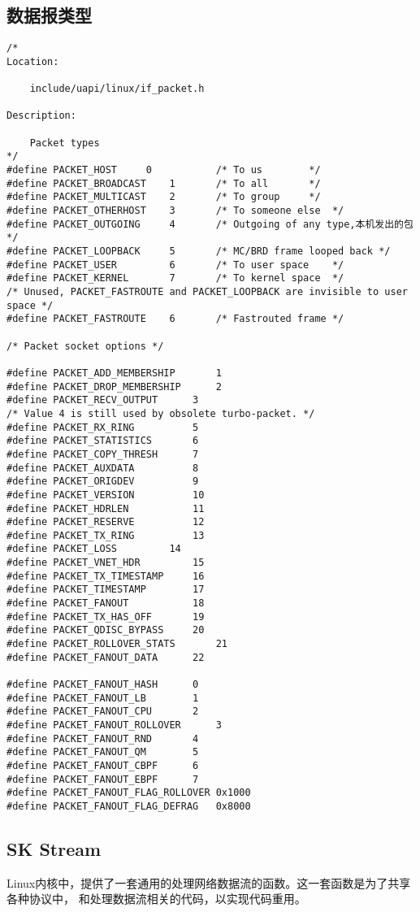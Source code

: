 		\subsection{数据报类型}
\begin{verbatim}
/* 
Location:

	include/uapi/linux/if_packet.h

Description:

	Packet types 
*/
#define PACKET_HOST		0			/* To us		*/
#define PACKET_BROADCAST	1		/* To all		*/
#define PACKET_MULTICAST	2		/* To group		*/
#define PACKET_OTHERHOST	3		/* To someone else 	*/
#define PACKET_OUTGOING		4		/* Outgoing of any type,本机发出的包 */
#define PACKET_LOOPBACK		5		/* MC/BRD frame looped back */
#define PACKET_USER			6		/* To user space	*/
#define PACKET_KERNEL		7		/* To kernel space	*/
/* Unused, PACKET_FASTROUTE and PACKET_LOOPBACK are invisible to user space */
#define PACKET_FASTROUTE	6		/* Fastrouted frame	*/

/* Packet socket options */

#define PACKET_ADD_MEMBERSHIP		1
#define PACKET_DROP_MEMBERSHIP		2
#define PACKET_RECV_OUTPUT		3
/* Value 4 is still used by obsolete turbo-packet. */
#define PACKET_RX_RING			5
#define PACKET_STATISTICS		6
#define PACKET_COPY_THRESH		7
#define PACKET_AUXDATA			8
#define PACKET_ORIGDEV			9
#define PACKET_VERSION			10
#define PACKET_HDRLEN			11
#define PACKET_RESERVE			12
#define PACKET_TX_RING			13
#define PACKET_LOSS			14
#define PACKET_VNET_HDR			15
#define PACKET_TX_TIMESTAMP		16
#define PACKET_TIMESTAMP		17
#define PACKET_FANOUT			18
#define PACKET_TX_HAS_OFF		19
#define PACKET_QDISC_BYPASS		20
#define PACKET_ROLLOVER_STATS		21
#define PACKET_FANOUT_DATA		22

#define PACKET_FANOUT_HASH		0
#define PACKET_FANOUT_LB		1
#define PACKET_FANOUT_CPU		2
#define PACKET_FANOUT_ROLLOVER		3
#define PACKET_FANOUT_RND		4
#define PACKET_FANOUT_QM		5
#define PACKET_FANOUT_CBPF		6
#define PACKET_FANOUT_EBPF		7
#define PACKET_FANOUT_FLAG_ROLLOVER	0x1000
#define PACKET_FANOUT_FLAG_DEFRAG	0x8000
\end{verbatim}	
		\subsection{SK Stream}
Linux内核中，提供了一套通用的处理网络数据流的函数。这一套函数是为了共享各种协议中，
和处理数据流相关的代码，以实现代码重用。

